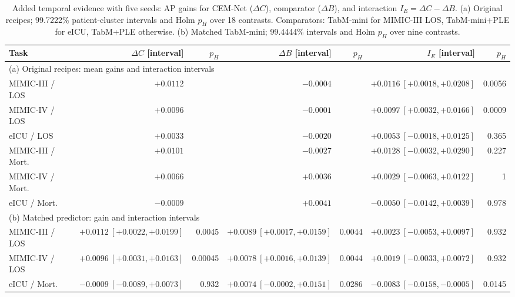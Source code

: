 \begin{table}[!tbp]
\centering\small
\setlength{\tabcolsep}{1.6pt}
\caption{Added temporal evidence with five seeds: AP gains for CEM-Net ($\Delta C$), comparator ($\Delta B$), and interaction $I_E=\Delta C-\Delta B$. (a) Original recipes; 99.7222\% patient-cluster intervals and Holm $p_H$ over 18 contrasts. Comparators: TabM-mini for MIMIC-III LOS, TabM-mini+PLE for eICU, TabM+PLE otherwise. (b) Matched TabM-mini; 99.4444\% intervals and Holm $p_H$ over nine contrasts.}
\label{tab:evidence}
\begin{tabular}{lrrrrrr}
\toprule
Task & $\Delta C$ [interval] & $p_H$ & $\Delta B$ [interval] & $p_H$ & $I_E$ [interval] & $p_H$ \\
\midrule
\multicolumn{7}{l}{(a) Original recipes: mean gains and interaction intervals} \\
MIMIC-III / LOS & $+0.0112$ &  & $-0.0004$ &  & $+0.0116\ [+0.0018,+0.0208]$ & 0.0056 \\
MIMIC-IV / LOS & $+0.0096$ &  & $-0.0001$ &  & $+0.0097\ [+0.0032,+0.0166]$ & 0.0009 \\
eICU / LOS & $+0.0033$ &  & $-0.0020$ &  & $+0.0053\ [-0.0018,+0.0125]$ & 0.365 \\
MIMIC-III / Mort. & $+0.0101$ &  & $-0.0027$ &  & $+0.0128\ [-0.0032,+0.0290]$ & 0.227 \\
MIMIC-IV / Mort. & $+0.0066$ &  & $+0.0036$ &  & $+0.0029\ [-0.0063,+0.0122]$ & 1 \\
eICU / Mort. & $-0.0009$ &  & $+0.0041$ &  & $-0.0050\ [-0.0142,+0.0039]$ & 0.978 \\
\midrule
\multicolumn{7}{l}{(b) Matched predictor: gain and interaction intervals} \\
MIMIC-III / LOS & $+0.0112\ [+0.0022,+0.0199]$ & 0.0045 & $+0.0089\ [+0.0017,+0.0159]$ & 0.0044 & $+0.0023\ [-0.0053,+0.0097]$ & 0.932 \\
MIMIC-IV / LOS & $+0.0096\ [+0.0031,+0.0163]$ & 0.00045 & $+0.0078\ [+0.0016,+0.0139]$ & 0.0044 & $+0.0019\ [-0.0033,+0.0072]$ & 0.932 \\
eICU / Mort. & $-0.0009\ [-0.0089,+0.0073]$ & 0.932 & $+0.0074\ [-0.0002,+0.0151]$ & 0.0286 & $-0.0083\ [-0.0158,-0.0005]$ & 0.0145 \\
\bottomrule
\end{tabular}
\end{table}
